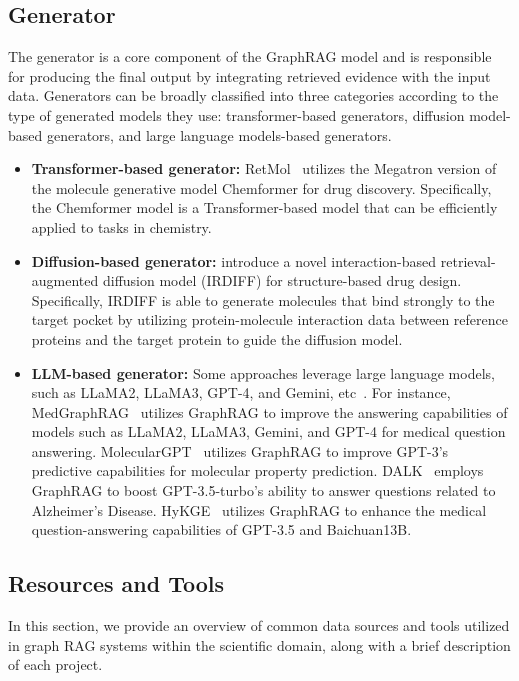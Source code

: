 \subsection{Generator}

The generator is a core component of the GraphRAG model and is responsible for producing the final output by integrating retrieved evidence with the input data.
Generators can be broadly classified into three categories according to the type of generated models they use: transformer-based generators, diffusion model-based generators, and large language models-based generators. 

\begin{itemize}[leftmargin=*]
    \item \textbf{Transformer-based generator:} RetMol~\cite{wangretrieval} utilizes the Megatron version of the molecule generative model Chemformer for drug discovery. Specifically,  the Chemformer model is a Transformer-based model that can be efficiently applied to tasks in chemistry.

    \item \textbf{Diffusion-based generator:} \citet{huanginteraction} introduce a novel interaction-based retrieval-augmented diffusion model (IRDIFF) for structure-based drug design. Specifically, IRDIFF is able to generate molecules that bind strongly to the target pocket by utilizing protein-molecule interaction data between reference proteins and the target protein to guide the diffusion model.

    \item \textbf{LLM-based generator:} Some approaches leverage large language models, such as LLaMA2, LLaMA3, GPT-4, and Gemini, etc~\cite{wu2024medical,jeong2024improving,pelletier2024explainable,liu2024moleculargpt,li2024dalk,soman2024biomedical}. For instance, MedGraphRAG~\cite{wu2024medical} utilizes GraphRAG to improve the answering capabilities of models such as LLaMA2, LLaMA3, Gemini, and GPT-4 for medical question answering. MolecularGPT~\cite{liu2024moleculargpt} utilizes GraphRAG to improve GPT-3's predictive capabilities for molecular property prediction. DALK~\cite{li2024dalk} employs GraphRAG to boost GPT-3.5-turbo's ability to answer questions related to Alzheimer’s Disease. HyKGE~\cite{jiang2024hykge} utilizes GraphRAG to enhance the medical question-answering capabilities of GPT-3.5 and Baichuan13B.
\end{itemize}

\subsection{Resources and Tools}
In this section, we provide an overview of common data sources and tools utilized in graph RAG systems within the scientific domain, along with a brief description of each project.
